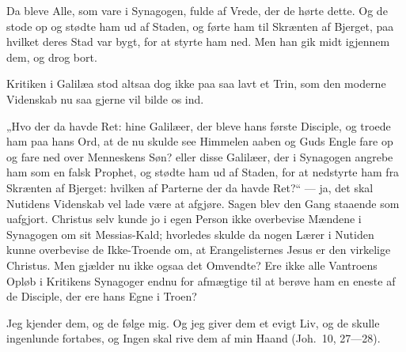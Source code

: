 \documentclass[12pt,a4paper]{book}
\begin{document}
\begingroup\large
Da bleve Alle, som vare i Synagogen, fulde af Vrede, der de hørte dette. Og de stode op
og stødte ham ud af Staden, og førte ham til Skrænten af Bjerget, paa hvilket deres Stad
var bygt, for at styrte ham ned. Men han gik midt igjennem dem, og drog bort.
\par\endgroup

Kritiken i Galilæa stod altsaa dog ikke paa saa lavt et Trin, som den moderne Videnskab
nu saa gjerne vil bilde os ind.

„Hvo der da havde Ret: hine Galilæer, der bleve hans første Disciple, og troede ham paa
hans Ord, at de nu skulde see Himmelen aaben og Guds Engle fare op og fare ned over
Menneskens Søn? eller disse Galilæer, der i Synagogen angrebe ham som en falsk Prophet,
og stødte ham ud af Staden, for at nedstyrte ham fra Skrænten af Bjerget: hvilken af
Parterne der da havde Ret?“ --- ja, det skal Nutidens Videnskab vel lade være at
afgjøre. Sagen blev den Gang staaende som uafgjort. Christus selv kunde jo i egen Person
ikke overbevise Mændene i Synagogen om sit Messias-Kald; hvorledes skulde da nogen Lærer
i Nutiden kunne overbevise de Ikke-Troende om, at Erangelisternes Jesus er den virkelige
Christus. Men gjælder nu ikke ogsaa det Omvendte? Ere ikke alle Vantroens Opløb i
Kritikens Synagoger endnu for afmægtige til at berøve ham en eneste af de Disciple, der
ere hans Egne i Troen?

\begingroup\large
Jeg kjender dem, og de følge mig. Og jeg giver dem et evigt Liv, og de skulle ingenlunde
fortabes, og Ingen skal rive dem af min Haand (Joh.\ 10, 27---28).
\par\endgroup
\end{document}
